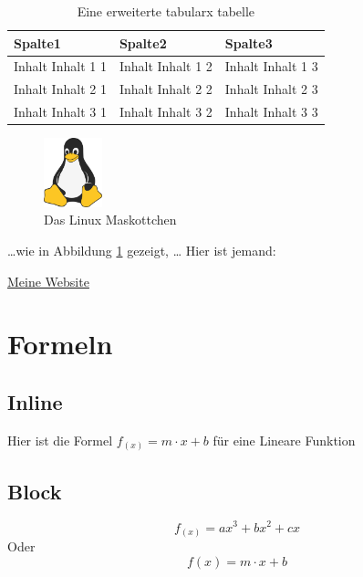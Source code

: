 \lipsum[1-2]

\begin{table}[h]
    \caption{Eine erweiterte tabularx tabelle}

    \begin{tabularx}{\textwidth}{|X|X|X|}
        \hline
        \textbf{Spalte1}  & \textbf{Spalte2}  & \textbf{Spalte3}  \\
        \hline
        Inhalt Inhalt 1 1 & Inhalt Inhalt 1 2 & Inhalt Inhalt 1 3 \\
        Inhalt Inhalt 2 1 & Inhalt Inhalt 2 2 & Inhalt Inhalt 2 3 \\
        Inhalt Inhalt 3 1 & Inhalt Inhalt 3 2 & Inhalt Inhalt 3 3 \\
        \hline
    \end{tabularx}
\end{table}

\lipsum[1-2]

\lipsum[1-2]

\begin{figure}[h]
    \centering
    \label{tux}
    \includegraphics[height=2cm]{assets/icon.png}
    \caption{Das Linux Maskottchen}
\end{figure}

\lipsum[1-2]

\ldots wie in Abbildung \ref{tux} gezeigt, \ldots
Hier ist jemand: \cite{einstein} \cite{knuth-fa}
\nocite{*}

\color{blue}
\href{https://mik-mueller.de}{Meine Website}
\color{black}

\chapter{Formeln}
\section{Inline}
Hier ist die Formel $f_{(x)}=m \cdot x + b$ für eine Lineare Funktion
\section{Block}
$$f_{(x)}=ax^3+bx^2+cx$$
Oder
\begin{equation}
    f(x) = m \cdot x + b
    \label{Lineare Funktion}
\end{equation}

